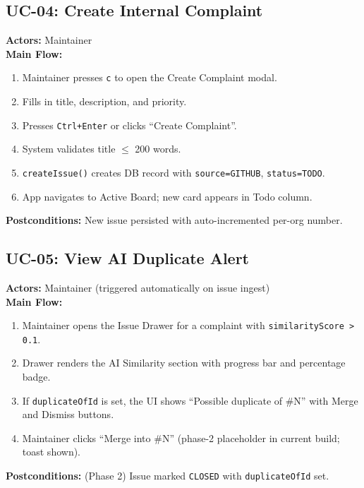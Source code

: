 \documentclass[12pt,a4paper]{report}
\begin{document}
\subsection{UC-04: Create Internal Complaint}
\begin{tcolorbox}[colback=gray!5,colframe=accent,title=UC-04 --- Create Complaint]
\textbf{Actors:} Maintainer \\
\textbf{Main Flow:}
\begin{enumerate}
  \item Maintainer presses \texttt{c} to open the Create Complaint modal.
  \item Fills in title, description, and priority.
  \item Presses \texttt{Ctrl+Enter} or clicks ``Create Complaint''.
  \item System validates title $\leq$ 200 words.
  \item \texttt{createIssue()} creates DB record with \texttt{source=GITHUB}, \texttt{status=TODO}.
  \item App navigates to Active Board; new card appears in Todo column.
\end{enumerate}
\textbf{Postconditions:} New issue persisted with auto-incremented per-org number.
\end{tcolorbox}

\subsection{UC-05: View AI Duplicate Alert}
\begin{tcolorbox}[colback=gray!5,colframe=accent,title=UC-05 --- AI Duplicate Detection]
\textbf{Actors:} Maintainer (triggered automatically on issue ingest) \\
\textbf{Main Flow:}
\begin{enumerate}
  \item Maintainer opens the Issue Drawer for a complaint with
    \texttt{similarityScore > 0.1}.
  \item Drawer renders the AI Similarity section with progress bar and
    percentage badge.
  \item If \texttt{duplicateOfId} is set, the UI shows ``Possible duplicate of
    \#N'' with Merge and Dismiss buttons.
  \item Maintainer clicks ``Merge into \#N'' (phase-2 placeholder in current
    build; toast shown).
\end{enumerate}
\textbf{Postconditions:} (Phase 2) Issue marked \texttt{CLOSED} with
\texttt{duplicateOfId} set.
\end{tcolorbox}
\end{document}
